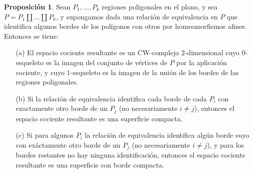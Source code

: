 \documentclass[10pt]{report}
\theoremstyle{definition}
\newtheorem{prop}[defin]{Proposición}
\begin{document}
\begin{prop}%
\label{prop:poligonos}
Sean $P_1,\dots, P_k$ regiones poligonales en el plano, y sea $P=P_1\amalg \dots \amalg P_k$, y supongamos dada una relación de equivalencia en $P$ que identifica algunos bordes de los polígonos con otros por homeomorfismos afines. Entonces se tiene:
\begin{itemize}
\item[(a)] El espacio cociente resultante es un CW-complejo $2$-dimensional cuyo $0$-esqueleto es la imagen del conjunto de vértices de $P$ por la aplicación cociente, y cuyo $1$-esqueleto es la imagen de la unión de los bordes de las regiones poligonales.
\item[(b)] Si la relación de equivalencia identifica cada borde de cada $P_i$ con exactamente otro borde de un $P_j$ (no necesariamente $i\neq j$), entonces el espacio cociente resultante es una superficie compacta.
\item[(c)] Si para algunos $P_i$ la relación de equivalencia identifica algún borde suyo con exáctamente otro borde de un $P_j$ (no necesariamente $i\neq j$), y para los bordes restantes no hay ninguna identificación, entonces el espacio cociente resultante es una superficie con borde compacta.
\end{itemize}
\end{prop}
\end{document}
